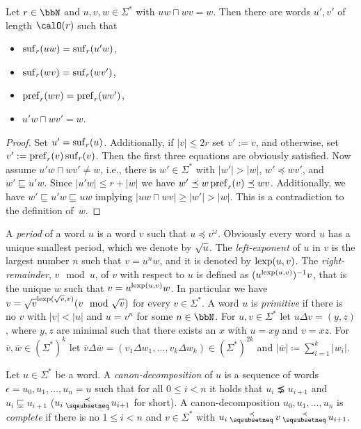 \begin{lemma}\label{lem:short_ends_construction}
	Let $r\in\bbN$ and $u,v,w \in\Sigma^\ast$ with $uw\sqcap wv = w$. %
	Then there are words $u',v'$ of length $\calO(r)$ such that 
	\begin{itemize}
		\item $\operatorname{suf}_r(uw) = \operatorname{suf}_r(u'w)$,
		\item $\operatorname{suf}_r(wv) = \operatorname{suf}_r(wv')$,
		\item $\operatorname{pref}_r(wv) = \operatorname{pref}_r(wv')$,
		\item $u'w\sqcap wv' = w$.
	\end{itemize}
\end{lemma}
\begin{proof}
	Set $u'=\operatorname{suf}_r(u)$. Additionally, if $|v|\leq 2r$ set $v':=v$, and otherwise, set $v':=\operatorname{pref}_r(v)\operatorname{suf}_r(v)$. Then the first three equations are obviously satisfied. Now assume $u'w\sqcap wv'\neq w$, i.e., there is $w'\in \Sigma^*$ with $|w'|>|w|$, $w'\preceq wv'$, and $w'\sqsubseteq u'w$. Since $|u'w|\leq r+|w|$ we have $w'\preceq w\operatorname{pref}_r(v)\preceq wv$. Additionally, we have $w'\sqsubseteq u'w\sqsubseteq uw$ implying $|uw\sqcap wv|\geq|w'|>|w|$. This is a contradiction to the definition of~$w$.
\end{proof}

A \emph{period} of a word $u$ is a word $v$ such that $u \preceq v^\omega$. Obviously every word $u$ has a unique smallest period, which we denote by $\sqrt{u}$. The \emph{left-exponent} of $u$ in $v$ is the largest number $n$ such that $v= u^nw$, and it is denoted by $\operatorname{lexp}(u,v)$. The \emph{right-remainder}, $v\mod u$,  of $v$ with respect to $u$ is defined as $(u^{\operatorname{lexp}(u,v)})^{-1}v$, that is the unique $w$ such that $v= u^{\operatorname{lexp}(u,v)}w$.  In particular we have $v= \root{v}^{\lexp(\root{v}, v)}(v \mod \root{v})$ for every $v\in\Sigma^\ast$. A word $u$ is \emph{primitive} if there is no $v$ with
$|v| < |u|$ and $u = v^n$ for some $n\in\bbN$.
For $u,v\in\Sigma^\ast$ let $u\Delta v = (y,z)$, where $y,z$ are minimal such that there exists an $x$ with $u=xy$ and $v=xz$. For $\bar{v}, \bar{w}\in(\Sigma^\ast)^k$ let 
$\bar{v}\Delta\bar{w} = (v_1\Delta w_1,\ldots, v_k\Delta w_k) \in (\Sigma^\ast)^{2k}$ and $|\bar{w}| \coloneq \sum_{i=1}^{k}|w_i|$. 

\begin{definition}
	Let $u\in \Sigma^\ast$ be a word. A \emph{canon-decomposition} of $u$ is a sequence of words $\epsilon = u_0,u_1,\ldots, u_n = u$ such that for all $0\leq i < n$ it holds that
	$u_i \precneq u_{i+1}$ and $u_i \sqsubsetneq u_{i+1}$ ($u_i \presuf u_{i+1}$ for short). A canon-decomposition $u_0,u_1,\ldots, u_n $ is \emph{complete} if there is no $1\leq i< n$ and $v\in\Sigma^\ast$ with $u_i \presuf v \presuf u_{i+1}$.
\end{definition}

